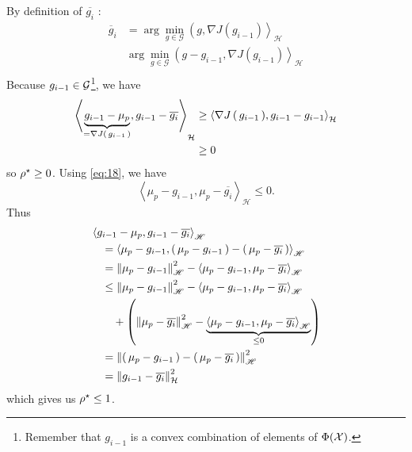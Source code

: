 \begin{boxcomputation}
By definition of $\overline{g_i}$ :
\begin{align*}
  \overline { g } _ { i } &= \arg \min _ { g \in \mathscr { G } } \left( g , \nabla J \left( g _ { i - 1 } \right) \right\rangle _ { \mathscr { H } }\\
  & \arg \min _ { g \in \mathscr { G } } \left( g - g _ { i - 1 } , \nabla J \left( g _ { i - 1 } \right) \right\rangle _ { \mathscr { H } }\\
\end{align*}
Because $g_{i-1} \in \mathcal{G}$\footnote{Remember that $g_{i-1}$ is a convex combination
of elements of $\Phi(\mathcal{X})$.}, we have
\begin{align*}
  \left\langle \underbrace{g _ { i - 1 } - \mu _ { p }}_{=\operatorname{\nabla\!}{J\left( \, g_{i-1} \, \right)}} , g _ { i - 1 } - \overline{g_i} \right\rangle _ { \mathcal { H } } &\geq
  \left\langle \operatorname{\nabla\!}{J\left( \, g_{i-1} \, \right)} , g _ { i - 1 } -  g _ { i - 1 }\right\rangle _ { \mathcal { H } }\\
  &\geq 0
\end{align*}
so $\ropt \geq 0$.
Using \eqref{eq:18}, we have
\begin{equation}
  \label{eq:neg}
  \left\langle \mu _ { p } - g _ { i -1} , \mu _ { p } - \overline { g _ { i } } \right\rangle _ { \mathscr { H } } \leq 0.
\end{equation}
Thus
\begin{align*}
  &\left\langle g _ { i - 1 } - \mu _ { p } , g _ { i - 1 } - \overline { g _ { i } } \right\rangle _ { \mathscr { H } } \\&\quad =
  \left\langle \mu_p-g_{i-1} , \left( \, \mu_p-g_{i-1} \, \right) - \left( \, \mu_p-\overline{g_i}  \, \right) \right\rangle_ { \mathscr { H } }\\
  &\quad =\left\| \mu_p-g_{i-1} \right\|_ { \mathscr { H } } ^ { 2 } - \left\langle \mu_p-g_{i-1} , \mu_p-\overline{g_i}  \right\rangle_ { \mathscr { H } }\\
  &\quad \leq \left\| \mu_p-g_{i-1} \right\|_ { \mathscr { H } } ^ { 2 } - \left\langle \mu_p-g_{i-1} , \mu_p-\overline{g_i}  \right\rangle_ { \mathscr { H } } \\&\qquad + \left( \left\| \mu_p-\overline{g_i}  \right\|_ { \mathscr { H } } ^ { 2 } - \underbrace{\left\langle \mu_p-g_{i-1} , \mu_p-\overline{g_i}  \right\rangle_ { \mathscr { H }} }_{\leq 0} \right)\\
  &\quad = \left\| \left( \, \mu_p-g_{i-1} \, \right) - \left( \, \mu_p-\overline{g_i}  \, \right) \right\|_ { \mathscr { H } } ^ { 2 }\\
  &\quad = \left\| g _ { i - 1 } - \overline{g_i} \right\| _ { \mathcal { H } } ^ { 2 }
\end{align*}
which gives us $\ropt \leq 1$.
 \end{boxcomputation}

